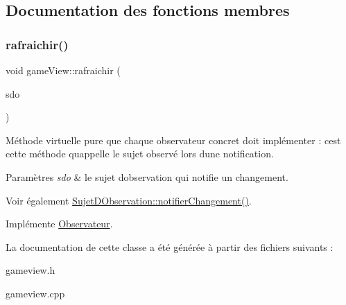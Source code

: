 \subsection{Documentation des fonctions membres}
\mbox{\label{classgame_view_a027b8c569f2861ac7633e859eadfae59}} 
\subsubsection{\texorpdfstring{rafraichir()}{rafraichir()}}
{\footnotesize\ttfamily void game\+View\+::rafraichir (\begin{DoxyParamCaption}\item[{\mbox{\hyperlink{class_sujet_d_observation}{Sujet\+D\+Observation}} $\ast$}]{sdo }\end{DoxyParamCaption})\hspace{0.3cm}{\ttfamily [virtual]}}



Méthode virtuelle pure que chaque observateur concret doit implémenter \+: c\textquotesingle{}est cette méthode qu\textquotesingle{}appelle le sujet observé lors d\textquotesingle{}une notification. 


\begin{DoxyParams}{Paramètres}
{\em sdo} & le sujet d\textquotesingle{}observation qui notifie un changement. \\
\hline
\end{DoxyParams}
\begin{DoxySeeAlso}{Voir également}
\mbox{\hyperlink{class_sujet_d_observation_ab4a833d911377a2dd3c83ce8ce3ac540}{Sujet\+D\+Observation\+::notifier\+Changement()}}. 
\end{DoxySeeAlso}


Implémente \mbox{\hyperlink{class_observateur_a4fcbecba73ee923d201246207b8470ce}{Observateur}}.



La documentation de cette classe a été générée à partir des fichiers suivants \+:\begin{DoxyCompactItemize}
\item 
gameview.\+h\item 
gameview.\+cpp\end{DoxyCompactItemize}

